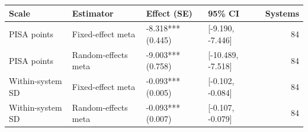 \begin{tabular}{llllr}
\toprule
Scale & Estimator & Effect (SE) & 95\% CI & Systems \\
\midrule
PISA points & Fixed-effect meta & -8.318*** (0.445) & [-9.190, -7.446] & 84 \\
PISA points & Random-effects meta & -9.003*** (0.758) & [-10.489, -7.518] & 84 \\
Within-system SD & Fixed-effect meta & -0.093*** (0.005) & [-0.102, -0.084] & 84 \\
Within-system SD & Random-effects meta & -0.093*** (0.007) & [-0.107, -0.079] & 84 \\
\bottomrule
\end{tabular}

